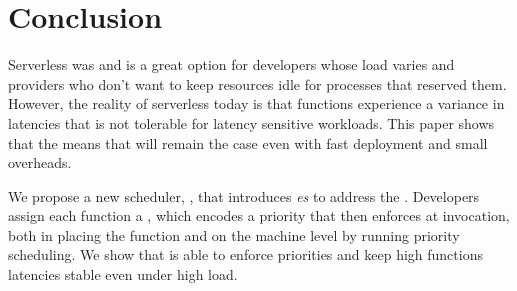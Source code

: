 \section{Conclusion}


Serverless was and is a great option for developers whose load varies and
providers who don't want to keep resources idle for processes that reserved
them. However, the reality of serverless today is that functions experience a
variance in latencies that is not tolerable for latency sensitive workloads.
This paper shows that the \problem{} means that will remain the case even with
fast deployment and small overheads.

We propose a new scheduler, \sys{}, that introduces \emph{\priceclass{}es} to
address the \problem{}. Developers assign each function a \priceclass{}, which
encodes a priority that \sys{} then enforces at invocation, both in placing the
function and on the machine level by running priority scheduling. We show that
\sys{} is able to enforce priorities and keep high \class{} functions latencies
stable even under high load.